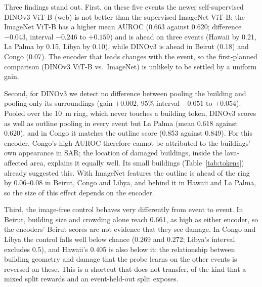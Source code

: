 \documentclass{ieeeaccess}
\begin{document}
Three findings stand out. First, on these five events the newer self-supervised DINOv3 ViT-B (web) is not better than the supervised ImageNet ViT-B: the ImageNet ViT-B has a higher mean AUROC (0.663 against 0.620; difference $-0.043$, interval $-0.246$ to $+0.159$) and is ahead on three events (Hawaii by 0.21, La Palma by 0.15, Libya by 0.10), while DINOv3 is ahead in Beirut (0.18) and Congo (0.07). The encoder that leads changes with the event, so the first-planned comparison (DINOv3 ViT-B vs.\ ImageNet) is unlikely to be settled by a uniform gain.

Second, for DINOv3 we detect no difference between pooling the building and pooling only its surroundings (gain $+0.002$, 95\% interval $-0.051$ to $+0.054$). Pooled over the 10~m ring, which never touches a building token, DINOv3 scores as well as outline pooling in every event but La Palma (mean 0.618 against 0.620), and in Congo it matches the outline score (0.853 against 0.849). For this encoder, Congo's high AUROC therefore cannot be attributed to the buildings' own appearance in SAR; the location of damaged buildings, inside the lava-affected area, explains it equally well. Its small buildings (Table~\ref{tab:tokens}) already suggested this. With ImageNet features the outline is ahead of the ring by 0.06--0.08 in Beirut, Congo and Libya, and behind it in Hawaii and La Palma, so the size of this effect depends on the encoder.

Third, the image-free control behaves very differently from event to event. In Beirut, building size and crowding alone reach 0.661, as high as either encoder, so the encoders' Beirut scores are not evidence that they see damage. In Congo and Libya the control falls well below chance (0.269 and 0.272; Libya's interval excludes 0.5), and Hawaii's 0.405 is also below it: the relationship between building geometry and damage that the probe learns on the other events is reversed on these. This is a shortcut that does not transfer, of the kind that a mixed split rewards and an event-held-out split exposes.
\end{document}
